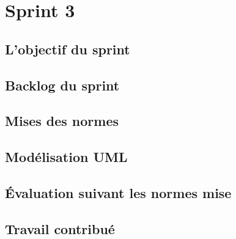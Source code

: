 \section{Sprint 3}
\subsection{L'objectif du sprint}
\subsection{Backlog du sprint}
\subsection{Mises des normes}
\subsection{Modélisation UML}
\subsection{Évaluation suivant les normes mise}
\subsection{Travail contribué}